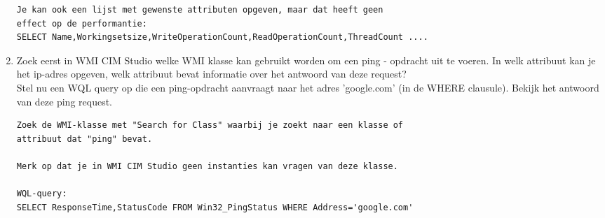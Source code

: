 \documentclass[11pt,a4paper]{report}
\begin{document}
\begin{enumerate}[resume]
\begin{lstlisting}
Je kan ook een lijst met gewenste attributen opgeven, maar dat heeft geen 
effect op de performantie:
SELECT Name,Workingsetsize,WriteOperationCount,ReadOperationCount,ThreadCount ....
	\end{lstlisting}
	\item Zoek eerst in WMI CIM Studio welke WMI klasse kan gebruikt worden om een ping - opdracht uit te voeren. In welk attribuut kan je het ip-adres opgeven, welk attribuut bevat informatie over het antwoord van deze request?\\
	Stel nu een WQL query op die een ping-opdracht aanvraagt naar het adres 'google.com' (in de WHERE clausule). Bekijk het antwoord van deze ping request.
	\begin{lstlisting}
Zoek de WMI-klasse met "Search for Class" waarbij je zoekt naar een klasse of 
attribuut dat "ping" bevat.

Merk op dat je in WMI CIM Studio geen instanties kan vragen van deze klasse. 

WQL-query:
SELECT ResponseTime,StatusCode FROM Win32_PingStatus WHERE Address='google.com'
	\end{lstlisting}
\end{enumerate}
\end{document}
